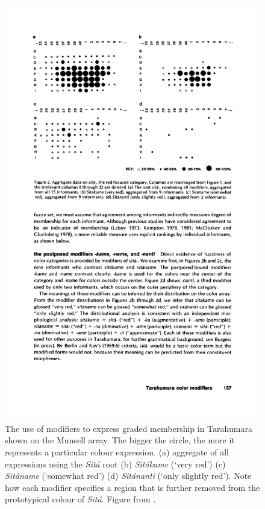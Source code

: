 \begin{figure}[htbp]
  \begin{center}
   \includegraphics[width=\textwidth]{./graded-membership/figures/burgress-tarahumara.pdf}
   \caption[The use of modifiers in Tarahumara]{The use of modifiers
     to express graded membership in Tarahumara shown on the Munsell
     array. The bigger the circle, the more it represents a
     particular colour expression. (a) aggregate of all expressions
     using the \textit{Sit\'a} root (b) \textit{Sit\'akame} (`very red') (c)
     \textit{Sit\'aname} (`somewhat red') (d) \textit{Sit\'ananti} (`only slightly
     red'). Note how each modifier specifies a region that is further
     removed from the prototypical colour of \textit{Sit\'a}. Figure from
     \cite{burgress83tarahumara}.}
    \label{f:gms-burgress-tarahumara}
  \end{center}
\end{figure}

